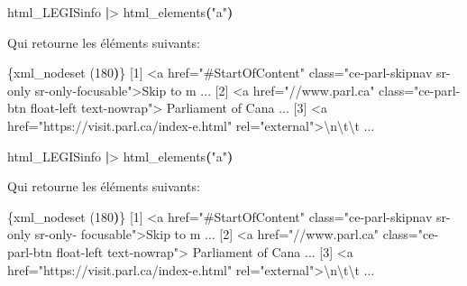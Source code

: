 \documentclass[
  letterpaper,
  DIV=11,
  numbers=noendperiod]{scrreprt}
\newenvironment{Shaded}{\begin{snugshade}}{\end{snugshade}}
\newcommand{\DataTypeTok}[1]{\textcolor[rgb]{0.68,0.00,0.00}{#1}}
\newcommand{\ErrorTok}[1]{\textcolor[rgb]{0.68,0.00,0.00}{#1}}
\newcommand{\ExtensionTok}[1]{\textcolor[rgb]{0.00,0.23,0.31}{#1}}
\newcommand{\KeywordTok}[1]{\textcolor[rgb]{0.00,0.23,0.31}{\textbf{#1}}}
\newcommand{\NormalTok}[1]{\textcolor[rgb]{0.00,0.23,0.31}{#1}}
\newcommand{\OperatorTok}[1]{\textcolor[rgb]{0.37,0.37,0.37}{#1}}
\newcommand{\StringTok}[1]{\textcolor[rgb]{0.13,0.47,0.30}{#1}}
\begin{document}
\begin{Shaded}
\begin{Highlighting}[]
\ExtensionTok{html\_LEGISinfo} \KeywordTok{|}\OperatorTok{\textgreater{}}\NormalTok{ html\_elements}\KeywordTok{(}\StringTok{"a"}\KeywordTok{)}
\end{Highlighting}
\end{Shaded}

Qui retourne les éléments suivants:

\begin{Shaded}
\begin{Highlighting}[]
\ExtensionTok{\{xml\_nodeset} \ErrorTok{(}\ExtensionTok{180}\KeywordTok{)}\ErrorTok{\}}
 \ExtensionTok{[1]} \OperatorTok{\textless{}}\NormalTok{a href=}\StringTok{"\#StartOfContent"}\NormalTok{ class=}\StringTok{"ce{-}parl{-}skipnav sr{-}only }
\StringTok{ sr{-}only{-}focusable"}\OperatorTok{\textgreater{}}\NormalTok{Skip to m ...}
 \ExtensionTok{[2]} \OperatorTok{\textless{}}\NormalTok{a href=}\StringTok{"//www.parl.ca"}\NormalTok{ class=}\StringTok{"ce{-}parl{-}btn float{-}left text{-}nowrap"}\OperatorTok{\textgreater{}}
 \ExtensionTok{Parliament}\NormalTok{ of Cana ...}
 \ExtensionTok{[3]} \OperatorTok{\textless{}}\NormalTok{a href=}\StringTok{"https://visit.parl.ca/index{-}e.html"}\NormalTok{ rel=}\StringTok{"external"}\OperatorTok{\textgreater{}}\DataTypeTok{\textbackslash{}n\textbackslash{}t\textbackslash{}t}\NormalTok{                    ...}
\end{Highlighting}
\end{Shaded}

\begin{Shaded}
\begin{Highlighting}[]
\ExtensionTok{html\_LEGISinfo} \KeywordTok{|}\OperatorTok{\textgreater{}}\NormalTok{ html\_elements}\KeywordTok{(}\StringTok{"a"}\KeywordTok{)}
\end{Highlighting}
\end{Shaded}

Qui retourne les éléments suivants:

\begin{Shaded}
\begin{Highlighting}[]
\ExtensionTok{\{xml\_nodeset} \ErrorTok{(}\ExtensionTok{180}\KeywordTok{)}\ErrorTok{\}}
 \ExtensionTok{[1]} \OperatorTok{\textless{}}\NormalTok{a href=}\StringTok{"\#StartOfContent"}\NormalTok{ class=}\StringTok{"ce{-}parl{-}skipnav sr{-}only sr{-}only{-}}
\StringTok{ focusable"}\OperatorTok{\textgreater{}}\NormalTok{Skip to m ...}
 \ExtensionTok{[2]} \OperatorTok{\textless{}}\NormalTok{a href=}\StringTok{"//www.parl.ca"}\NormalTok{ class=}\StringTok{"ce{-}parl{-}btn float{-}left text{-}nowrap"}\OperatorTok{\textgreater{}}
 \ExtensionTok{Parliament}\NormalTok{ of Cana ...}
 \ExtensionTok{[3]} \OperatorTok{\textless{}}\NormalTok{a href=}\StringTok{"https://visit.parl.ca/index{-}e.html"}\NormalTok{ rel=}\StringTok{"external"}\OperatorTok{\textgreater{}}\DataTypeTok{\textbackslash{}n\textbackslash{}t\textbackslash{}t}\NormalTok{                    ...}
\end{Highlighting}
\end{Shaded}
\end{document}
